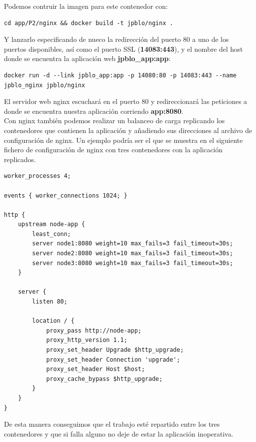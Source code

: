 Podemos contruir la imagen para este contenedor con: \\

\begin{lstlisting}
cd app/P2/nginx && docker build -t jpblo/nginx .
\end{lstlisting}

Y lanzarlo especificando de nueco la redirección del puerto 80 a uno de los puertos disponibles, así como el puerto SSL (\textbf{14083:443}), y el nombre del host donde se encuentra la aplicación web \textbf{jpblo\_app:app}: \\

\begin{lstlisting}
docker run -d --link jpblo_app:app -p 14080:80 -p 14083:443 --name jpblo_nginx jpblo/nginx
\end{lstlisting}

El servidor web nginx escuchará en el puerto 80 y redireccionará las peticiones a donde se encuentra nuestra aplicación corriendo \textbf{app:8080}. \\

Con nginx también podemos realizar un balanceo de carga replicando los contenedores que contienen la aplicación y añadiendo sus direcciones al archivo de configuración de nginx. Un ejemplo podría ser el que se muestra en el siguiente fichero de configuración de nginx con tres contenedores con la aplicación replicados. \\


\begin{lstlisting}
worker_processes 4;

events { worker_connections 1024; }

http {
	upstream node-app {
		least_conn;
		server node1:8080 weight=10 max_fails=3 fail_timeout=30s;
		server node2:8080 weight=10 max_fails=3 fail_timeout=30s;
		server node3:8080 weight=10 max_fails=3 fail_timeout=30s;
	}
		
	server {
		listen 80;
	
		location / {
			proxy_pass http://node-app;
			proxy_http_version 1.1;
			proxy_set_header Upgrade $http_upgrade;
			proxy_set_header Connection 'upgrade';
			proxy_set_header Host $host;
			proxy_cache_bypass $http_upgrade;
		}
	}
}
\end{lstlisting}

De esta manera conseguimos que el trabajo esté repartido entre los tres contenedores y que si falla alguno no deje de estar la aplicación inoperativa. \\

